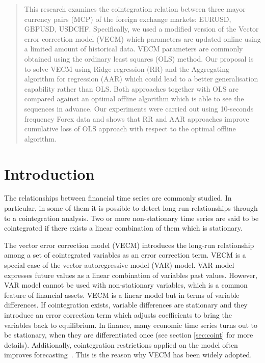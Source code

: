 \documentclass[twocolumn]{svjour3}          %
\begin{document}
\begin{abstract}

This research examines the cointegration relation between three mayor currency pairs (MCP) of the foreign exchange markets:  EURUSD, GBPUSD, USDCHF. Specifically, we used a modified version of the Vector error correction model (VECM) which parameters are updated online using a limited amount of historical data.
VECM parameters are commonly obtained using the
ordinary least squares (OLS) method. Our proposal is to solve VECM using Ridge regression (RR) and the Aggregating algorithm for regression (AAR) which could lead to a better generalisation capability rather than OLS. Both approaches together with OLS are compared against an optimal offline algorithm which is able to see the sequences in advance.
Our experiments were carried out using 10-seconds frequency Forex data and shows that RR and AAR approaches improve cumulative loss of OLS approach with respect to the optimal offline algorithm.



\end{abstract}

\section{Introduction}
\label{sec:introduction}

The relationships between financial time series are commonly studied. In particular, in some of them
it is possible to detect long-run relationships through to a cointegration analysis. Two or more non-stationary time series are said to be cointegrated if there exists a linear combination of them which is stationary.

The vector error correction model (VECM) introduces the long-run relationship among a set of cointegrated variables
as an error correction term. VECM is a special case of the vector autoregressive
model (VAR) model. VAR model expresses future values as a linear combination of
variables past values.  However, VAR model cannot be used with non-stationary
variables, which is a common feature of financial assets. VECM is a linear model
but in terms of variable differences. If cointegration exists, variable
differences are stationary and they introduce an error correction term which
adjusts coefficients to bring the variables back to equilibrium. In finance,
many economic time series turns out to be stationary, when they are differentiated once (see section \ref{sec:coint} for more details). Additionally, cointegration restrictions applied on the model often improves forecasting~\cite{duy1998}. This is the reason why VECM has been widely adopted.
\end{document}
